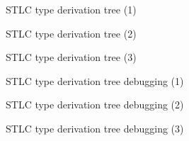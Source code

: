 \documentclass{beamer}
\begin{document}
\begin{frame}{STLC type derivation tree (1)}
\begin{center}
{\tiny

}
\end{center}
\end{frame}

\begin{frame}{STLC type derivation tree (2)}
\begin{center}
{\tiny

}
\end{center}
\end{frame}

\begin{frame}{STLC type derivation tree (3)}
\begin{center}
\scalebox{.3}{

}
\end{center}
\end{frame}

\begin{frame}{STLC type derivation tree debugging (1)}
\begin{center}
\scalebox{.5}{

}
\end{center}
\end{frame}

\begin{frame}{STLC type derivation tree debugging (2)}
\begin{center}
{\tiny

}
\end{center}
\end{frame}

\begin{frame}{STLC type derivation tree debugging (3)}
\begin{center}
{\tiny

}
\end{center}
\end{frame}
\end{document}
